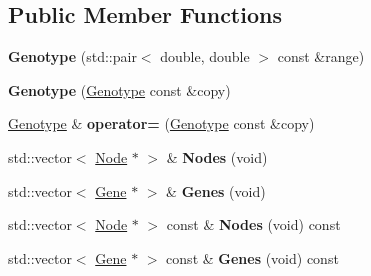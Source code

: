 \subsection*{Public Member Functions}
\begin{DoxyCompactItemize}
\item 
\mbox{\label{class_indie_neat_1_1_genotype_ae0580322e5095a549a514af6986e92ae}} 
{\bfseries Genotype} (std\+::pair$<$ double, double $>$ const \&range)
\item 
\mbox{\label{class_indie_neat_1_1_genotype_a61b75e0ad6ab03232cda13ab7de78c79}} 
{\bfseries Genotype} (\hyperlink{class_indie_neat_1_1_genotype}{Genotype} const \&copy)
\item 
\mbox{\label{class_indie_neat_1_1_genotype_afaac0a604631f5d52c5a3d2d9ba737b3}} 
\hyperlink{class_indie_neat_1_1_genotype}{Genotype} \& {\bfseries operator=} (\hyperlink{class_indie_neat_1_1_genotype}{Genotype} const \&copy)
\item 
\mbox{\label{class_indie_neat_1_1_genotype_a660be7d08066d8a4d4dbd98fc90d9e64}} 
std\+::vector$<$ \hyperlink{class_indie_neat_1_1_genotype_1_1_node}{Node} $\ast$ $>$ \& {\bfseries Nodes} (void)
\item 
\mbox{\label{class_indie_neat_1_1_genotype_a5e07223bea57cce159a4856b0f1d4be9}} 
std\+::vector$<$ \hyperlink{class_indie_neat_1_1_genotype_1_1_gene}{Gene} $\ast$ $>$ \& {\bfseries Genes} (void)
\item 
\mbox{\label{class_indie_neat_1_1_genotype_a21689d356b3e334dcc748b303537a7c5}} 
std\+::vector$<$ \hyperlink{class_indie_neat_1_1_genotype_1_1_node}{Node} $\ast$ $>$ const  \& {\bfseries Nodes} (void) const
\item 
\mbox{\label{class_indie_neat_1_1_genotype_a27509878844ce83fde93f94c62f031b9}} 
std\+::vector$<$ \hyperlink{class_indie_neat_1_1_genotype_1_1_gene}{Gene} $\ast$ $>$ const  \& {\bfseries Genes} (void) const
\item 
\mbox{\label{class_indie_neat_1_1_genotype_a177c51e16af584e32f33aa0b2274f6b0}} 

\end{DoxyCompactItemize}
